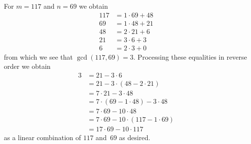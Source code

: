 \documentclass{jn-pset}
\begin{document}
\begin{problem}
\begin{solution}
  For
  $m = 117$
  and
  $n = 69$
  we obtain
  \begin{align*}   
    117 &= 1 \cdot 69 + 48 \\
    69  &= 1 \cdot 48 + 21 \\
    48  &= 2 \cdot 21 +  6 \\
    21  &= 3 \cdot 6 +  3 \\   
    6  &= 2 \cdot  3 +  0
  \end{align*}
  from which we see that 
  $
  \gcd (117, 69) = 3
  $.
  Processing these equalities in reverse order we obtain
  \begin{align*}
     3 &= 
         21 - 3 \cdot  6          
    \\
       &=
         21 - 3 \cdot ( 48 - 2 \cdot 21 )
    \\
       &=
         7 \cdot 21 - 3 \cdot  48    
    \\
       &=
         7 \cdot ( 69 - 1 \cdot 48 )
         - 3 \cdot  48
    \\
       &=
         7 \cdot  69 - 10 \cdot  48
    \\   
       &=
         7 \cdot  69 - 10 \cdot (117 - 1 \cdot 69 )         
    \\   
       &=
         17 \cdot  69 - 10 \cdot 117 
  \end{align*}
  as a linear combination of
  $117$ and~$69$ as desired.
\end{solution}


\end{problem}
\end{document}
